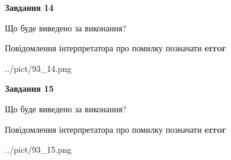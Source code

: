 \documentclass[11pt, ukrainian]{article}
\begin{document}
{\begin {large}
{\begin {center}\textbf{Завдання 14}\end {center}}\par
Що буде виведено за виконання? \par
Повідомлення інтерпретатора про помилку позначати \textbf{error}

\begin{center}
	{../pict/93_14.png}
\end{center}
\newpage

{\begin {center}\textbf{Завдання 15}\end {center}}\par
Що буде виведено за виконання? \par
Повідомлення інтерпретатора про помилку позначати \textbf{error}

\begin{center}
	{../pict/93_15.png}
\end{center}
\newpage

\end {large}}
\end{document}
